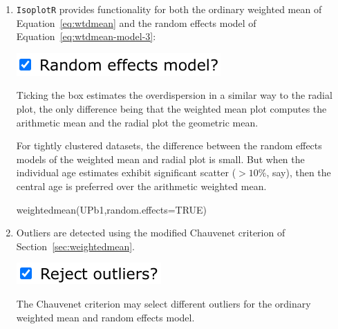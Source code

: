 \begin{refsection}
\begin{enumerate}
\item \texttt{IsoplotR} provides functionality for both the ordinary
  weighted mean of Equation~\ref{eq:wtdmean} and the random effects
  model of Equation~\ref{eq:wtdmean-model-3}:

\noindent\begin{minipage}[t]{.3\linewidth}
\strut\vspace*{-\baselineskip}\newline
\includegraphics[width=\linewidth]{../figures/UPbWtdMeanRandomEffects.png}
\end{minipage}
\begin{minipage}[t]{.7\linewidth}
  Ticking the box estimates the overdispersion in a similar way to the
  radial plot, the only difference being that the weighted mean plot
  computes the arithmetic mean and the radial plot the geometric mean.
\end{minipage}

For tightly clustered datasets, the difference between the random
effects models of the weighted mean and radial plot is small.  But
when the individual age estimates exhibit significant scatter
($>10$\%, say), then the central age is preferred over the arithmetic
weighted mean.

\begin{console}
weightedmean(UPb1,random.effects=TRUE)
\end{console}
  
\item Outliers are detected using the modified Chauvenet criterion of
  Section~\ref{sec:weightedmean}.

\noindent\begin{minipage}[t]{.22\linewidth}
\strut\vspace*{-\baselineskip}\newline
\includegraphics[width=\linewidth]{../figures/UPbWtdMeanOutliers.png}
\end{minipage}
\begin{minipage}[t]{.78\linewidth}
  The Chauvenet criterion may select different outliers for the
  ordinary weighted mean and random effects model.
\end{minipage}


\end{enumerate}
\end{refsection}
